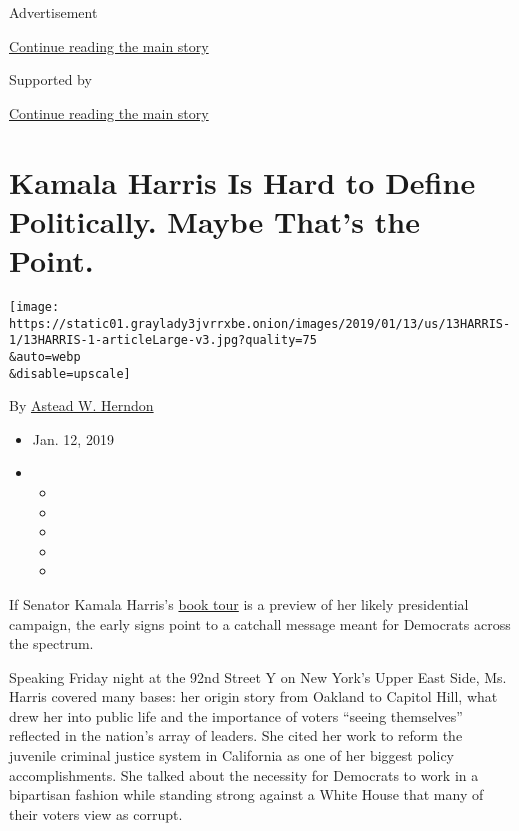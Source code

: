 Advertisement

\protect\hyperlink{after-top}{Continue reading the main story}

Supported by

\protect\hyperlink{after-sponsor}{Continue reading the main story}

\hypertarget{kamala-harris-is-hard-to-define-politically-maybe-thats-the-point}{%
\section{Kamala Harris Is Hard to Define Politically. Maybe That's the
Point.}\label{kamala-harris-is-hard-to-define-politically-maybe-thats-the-point}}

\texttt{[image: https://static01.graylady3jvrrxbe.onion/images/2019/01/13/us/13HARRIS-1/13HARRIS-1-articleLarge-v3.jpg?quality=75\\\&auto=webp\\\&disable=upscale]}

By \href{https://www.nytimes3xbfgragh.onion/by/astead-w-herndon}{Astead
W. Herndon}

\begin{itemize}
\item
  Jan. 12, 2019
\item
  \begin{itemize}
  \item
  \item
  \item
  \item
  \item
  \end{itemize}
\end{itemize}

If Senator Kamala Harris's
\href{https://www.nytimes3xbfgragh.onion/2019/01/11/books/kamala-harris-book.html}{book
tour} is a preview of her likely presidential campaign, the early signs
point to a catchall message meant for Democrats across the spectrum.

Speaking Friday night at the 92nd Street Y on New York's Upper East
Side, Ms. Harris covered many bases: her origin story from Oakland to
Capitol Hill, what drew her into public life and the importance of
voters ``seeing themselves'' reflected in the nation's array of leaders.
She cited her work to reform the juvenile criminal justice system in
California as one of her biggest policy accomplishments. She talked
about the necessity for Democrats to work in a bipartisan fashion while
standing strong against a White House that many of their voters view as
corrupt.

